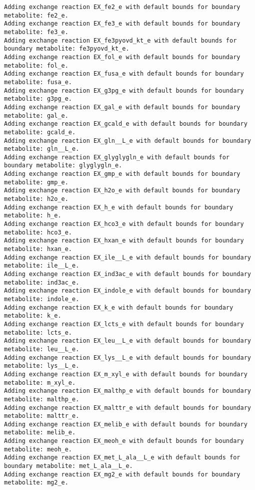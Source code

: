 \documentclass[
  letterpaper,
  DIV=11,
  numbers=noendperiod]{scrartcl}
\begin{document}
\begin{verbatim}
Adding exchange reaction EX_fe2_e with default bounds for boundary metabolite: fe2_e.
Adding exchange reaction EX_fe3_e with default bounds for boundary metabolite: fe3_e.
Adding exchange reaction EX_fe3pyovd_kt_e with default bounds for boundary metabolite: fe3pyovd_kt_e.
Adding exchange reaction EX_fol_e with default bounds for boundary metabolite: fol_e.
Adding exchange reaction EX_fusa_e with default bounds for boundary metabolite: fusa_e.
Adding exchange reaction EX_g3pg_e with default bounds for boundary metabolite: g3pg_e.
Adding exchange reaction EX_gal_e with default bounds for boundary metabolite: gal_e.
Adding exchange reaction EX_gcald_e with default bounds for boundary metabolite: gcald_e.
Adding exchange reaction EX_gln__L_e with default bounds for boundary metabolite: gln__L_e.
Adding exchange reaction EX_glyglygln_e with default bounds for boundary metabolite: glyglygln_e.
Adding exchange reaction EX_gmp_e with default bounds for boundary metabolite: gmp_e.
Adding exchange reaction EX_h2o_e with default bounds for boundary metabolite: h2o_e.
Adding exchange reaction EX_h_e with default bounds for boundary metabolite: h_e.
Adding exchange reaction EX_hco3_e with default bounds for boundary metabolite: hco3_e.
Adding exchange reaction EX_hxan_e with default bounds for boundary metabolite: hxan_e.
Adding exchange reaction EX_ile__L_e with default bounds for boundary metabolite: ile__L_e.
Adding exchange reaction EX_ind3ac_e with default bounds for boundary metabolite: ind3ac_e.
Adding exchange reaction EX_indole_e with default bounds for boundary metabolite: indole_e.
Adding exchange reaction EX_k_e with default bounds for boundary metabolite: k_e.
Adding exchange reaction EX_lcts_e with default bounds for boundary metabolite: lcts_e.
Adding exchange reaction EX_leu__L_e with default bounds for boundary metabolite: leu__L_e.
Adding exchange reaction EX_lys__L_e with default bounds for boundary metabolite: lys__L_e.
Adding exchange reaction EX_m_xyl_e with default bounds for boundary metabolite: m_xyl_e.
Adding exchange reaction EX_malthp_e with default bounds for boundary metabolite: malthp_e.
Adding exchange reaction EX_malttr_e with default bounds for boundary metabolite: malttr_e.
Adding exchange reaction EX_melib_e with default bounds for boundary metabolite: melib_e.
Adding exchange reaction EX_meoh_e with default bounds for boundary metabolite: meoh_e.
Adding exchange reaction EX_met_L_ala__L_e with default bounds for boundary metabolite: met_L_ala__L_e.
Adding exchange reaction EX_mg2_e with default bounds for boundary metabolite: mg2_e.

\end{verbatim}
\end{document}
